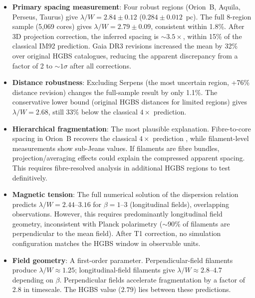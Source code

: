 \documentclass[twoside,twocolumn]{mnras}
\begin{document}
\begin{itemize}

    \item \textbf{Primary spacing measurement}: Four robust regions (Orion~B, Aquila,
    Perseus, Taurus) give $\lambda/W = 2.84 \pm 0.12$ ($0.284 \pm 0.012$~pc). The
    full 8-region sample (5,069 cores) gives $\lambda/W = 2.79 \pm 0.09$, consistent
    within 1.8\%. After 3D projection correction, the inferred spacing is ${\sim}3.5\times$,
    within 15\% of the classical IM92 prediction. Gaia DR3 revisions increased the mean
    by 32\% over original HGBS catalogues, reducing the apparent discrepancy from a
    factor of 2 to ${\sim}1\sigma$ after all corrections.

    \item \textbf{Distance robustness}: Excluding Serpens (the most uncertain region,
    +76\% distance revision) changes the full-sample result by only 1.1\%.
    The conservative lower bound (original HGBS distances for limited regions) gives
    $\lambda/W = 2.68$, still 33\% below the classical $4\times$ prediction.

    \item \textbf{Hierarchical fragmentation}: The most plausible explanation.
    Fibre-to-core spacing in Orion~B recovers the classical $4\times$ prediction
    \citep{Yang2024}, while filament-level measurements show sub-Jeans values.
    If filaments are fibre bundles, projection/averaging effects could explain the
    compressed apparent spacing. This requires fibre-resolved analysis in additional
    HGBS regions to test definitively.

    \item \textbf{Magnetic tension}: The full numerical solution of the dispersion
    relation predicts $\lambda/W = 2.44$--$3.16$ for $\beta = 1$--$3$ (longitudinal
    fields), overlapping observations. However, this requires predominantly longitudinal
    field geometry, inconsistent with Planck polarimetry ($\sim$90\% of filaments
    are perpendicular to the mean field). After T1 correction, no simulation
    configuration matches the HGBS window in observable units.

    \item \textbf{Field geometry}: A first-order parameter. Perpendicular-field
    filaments produce $\lambda/W \approx 1.25$; longitudinal-field filaments give
    $\lambda/W \approx 2.8$--$4.7$ depending on $\beta$. Perpendicular fields accelerate
    fragmentation by a factor of 2.8 in timescale. The HGBS value ($2.79$) lies between
    these predictions.


\end{itemize}
\end{document}
